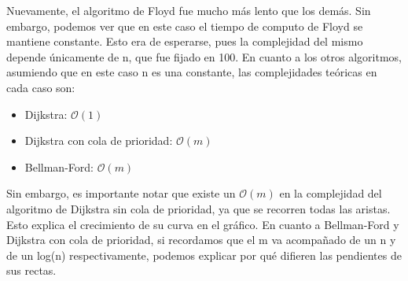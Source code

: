 Nuevamente, el algoritmo de Floyd fue mucho más lento que los demás. Sin embargo, podemos ver que en este caso el tiempo de computo de Floyd se mantiene constante. Esto era de esperarse, pues la complejidad del mismo depende únicamente de n, que fue fijado en 100.
En cuanto a los otros algoritmos, asumiendo que en este caso n es una constante, las complejidades teóricas en cada caso son:
\begin{itemize}
\item Dijkstra: $\mathcal{O}(1)$
\item Dijkstra con cola de prioridad: $\mathcal{O}(m)$
\item Bellman-Ford: $\mathcal{O}(m)$
\end{itemize}
Sin embargo, es importante notar que existe un $\mathcal{O}(m)$ en la complejidad del algoritmo de Dijkstra sin cola de prioridad, ya que se recorren todas las aristas. Esto explica el crecimiento de su curva en el gráfico. En cuanto a Bellman-Ford y Dijkstra con cola de prioridad, si recordamos que el m va acompañado de un n y de un log(n) respectivamente, podemos explicar por qué difieren las pendientes de sus rectas.
